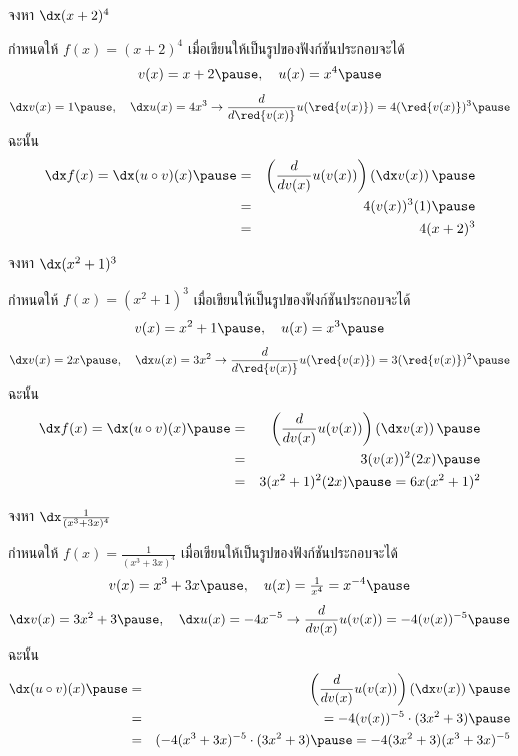 \begin{frame}[t]
\begin{ex}
จงหา $\dx (x+2)^4$
\end{ex}
\begin{sol}
กำหนดให้ $f(x) = (x+2)^4$ \pause เมื่อเขียนให้เป็นรูปของฟังก์ชันประกอบจะได้ \pause
\[ v(x) = x+2\pause, \quad u(x) = x^4 \pause \]
\[ \dx v(x) = 1\pause, \quad \dx u(x) = 4x^3 \rightarrow \frac{d}{d\red{v(x)}} u(\red{v(x)}) = 4(\red{v(x)})^3\pause\]
ฉะนั้น
\begin{eqnarray*}
\dx f(x) = \dx (u \circ v)(x) \pause &=&  \left(\frac{d}{d v(x)} u(v(x))\right)\left( \dx v(x)\right) \pause \\
&=& 4(v(x))^3 (1) \pause \\
&=&  4(x+2)^3
\end{eqnarray*}
\end{sol}
\end{frame}


\begin{frame}[t]
\begin{ex}
จงหา $\dx (x^2+1)^3$
\end{ex}
\begin{sol}
กำหนดให้ $f(x) = (x^2+1)^3$ \pause เมื่อเขียนให้เป็นรูปของฟังก์ชันประกอบจะได้ \pause
\[ v(x) = x^2+1 \pause, \quad u(x) = x^3\pause\]
\[\dx v(x) = 2x\pause, \quad \dx u(x) = 3x^2 \rightarrow \frac{d}{d\red{v(x)}} u(\red{v(x)}) = 3(\red{v(x)})^2\pause\] 
ฉะนั้น
\begin{eqnarray*}
\dx f(x) = \dx (u \circ v)(x) \pause &=&  \left(\frac{d}{d v(x)} u(v(x))\right)\left( \dx v(x)\right) \pause \\
&=& 3(v(x))^2 (2x) \pause \\
&=&  3(x^2+1)^2 (2x) \pause = 6x(x^2+1)^2
\end{eqnarray*}
\end{sol}
\end{frame}


\begin{frame}[t]
\begin{ex}
จงหา $\dx  \frac{1}{(x^3+3x)^4}$
\end{ex}
\begin{sol}
กำหนดให้ $f(x) = \tfrac{1}{(x^3+3x)^4}$ \pause เมื่อเขียนให้เป็นรูปของฟังก์ชันประกอบจะได้ \pause
\[ v(x) = x^3+3x\pause, \quad u(x) = \tfrac{1}{x^4} = x^{-4}\pause\]
\[ \dx v(x) = 3x^2+3\pause, \quad \dx u(x) = -4x^{-5} \rightarrow \frac{d}{dv(x)} u(v(x)) = -4(v(x))^{-5}\pause\]
ฉะนั้น
\begin{eqnarray*}
\dx (u \circ v)(x) \pause &=& \left(\frac{d}{d v(x)} u(v(x))\right)\left( \dx v(x)\right)\pause \\
&=&= -4(v(x))^{-5} \cdot (3x^2+3) \pause \\
&=&  (-4(x^3+3x)^{-5} \cdot (3x^2+3) \pause= -4(3x^2+3)(x^3+3x)^{-5}
\end{eqnarray*}
\end{sol}
\end{frame}

